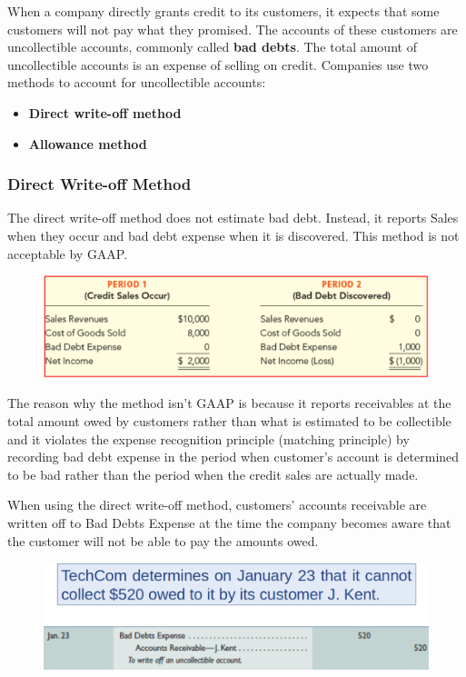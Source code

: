 \documentclass[../main.tex]{subfiles}
\begin{document}
	When a company directly grants credit to its customers, it expects that 
	some customers will not pay what they promised. The accounts of these 
	customers are uncollectible accounts, commonly called \textbf{bad debts}. 
	The total amount of uncollectible accounts is an expense of selling on 
	credit. Companies use two methods to account for uncollectible accounts: 
	\begin{itemize}[noitemsep]
		\item \textbf{Direct write-off method}
		\item \textbf{Allowance method}
	\end{itemize}
	
	\subsubsection{Direct Write-off Method}
	
	The direct write-off method does not estimate bad debt. Instead, it 
	reports Sales when they occur and bad debt expense when it is discovered. 
	This method is not acceptable by GAAP.
	
	\begin{figure}[ht]
		\centering
		\includegraphics[width=\columnwidth]{images/c6/direct_writeoff.png}
	\end{figure}

	The reason why the method isn't GAAP is because it reports receivables at 
	the total amount owed by customers rather than what is estimated to be 
	collectible and it violates the expense recognition principle (matching 
	principle) by recording bad debt expense in the period when customer's 
	account is determined to be bad rather than the period when the credit 
	sales are actually made. 
	
	When using the direct write-off method, customers’ accounts receivable are 
	written off to Bad Debts Expense at the time the company becomes aware that 
	the customer will not be able to pay the amounts owed.
	
	\begin{figure}[ht]
		\centering
		\includegraphics[width=\columnwidth]{images/c6/direct_writeoff_eg.png}
	\end{figure}
\end{document}
